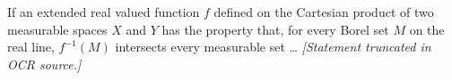 If an extended real valued function $f$ defined on the Cartesian product of two measurable spaces $X$ and $Y$ has the property that, for every Borel set $M$ on the real line, $f^{-1}(M)$ intersects every measurable set \dots
\textit{[Statement truncated in OCR source.]}
